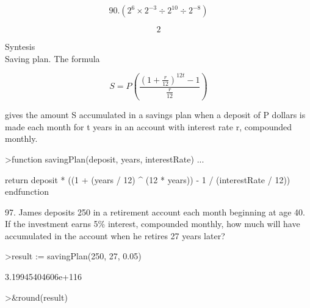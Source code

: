 \documentclass[a4paper,10pt]{article}
\begin{document}
\begin{eulernotebook}
\begin{eulercomment}
\begin{eulercomment}
\begin{eulercomment}
\begin{eulercomment}
\begin{eulercomment}
\begin{eulercomment}
\begin{eulercomment}
\begin{eulercomment}
\begin{eulercomment}
\end{eulercomment}
\begin{eulerformula}
\[
90. \left(2^{6}\times2^{-3} \div 2^{10} \div 2^{-8}\right)
\]
\end{eulerformula}
\begin{eulercomment}
\end{eulercomment}
\begin{eulerformula}
\[
2
\]
\end{eulerformula}
\begin{eulercomment}
Syntesis\\
Saving plan. The formula

\end{eulercomment}
\begin{eulerformula}
\[
S = P \left(\frac{(1 + \frac{r}{12})^{12t} - 1}{\frac{r}{12}}\right)
\]
\end{eulerformula}
\begin{eulercomment}
gives the amount S accumulated in a savings plan when a deposit of P
dollars is made each month for t years in an account with interest
rate r, compounded monthly.
\end{eulercomment}
\begin{eulerprompt}
>function savingPlan(deposit, years, interestRate) ...
\end{eulerprompt}
\begin{eulerudf}
  return deposit * ((1 + (years / 12) ^ (12 * years)) - 1 / (interestRate / 12))
  endfunction
\end{eulerudf}
\begin{eulercomment}
97. James deposits \textdollar{}250 in a retirement account each month beginning
at age 40. If the investment earns 5\% interest, compounded monthly,
how much will have accumulated in the account when he retires 27 years
later?
\end{eulercomment}
\begin{eulerprompt}
>result := savingPlan(250, 27, 0.05)
\end{eulerprompt}
\begin{euleroutput}
  3.19945404606e+116
\end{euleroutput}
\begin{eulerprompt}
>&round(result)
\end{eulerprompt}
\begin{euleroutput}
  

\end{euleroutput}
\end{eulercomment}
\end{eulercomment}
\end{eulercomment}
\end{eulercomment}
\end{eulercomment}
\end{eulercomment}
\end{eulercomment}
\end{eulercomment}
\end{eulernotebook}
\end{document}
